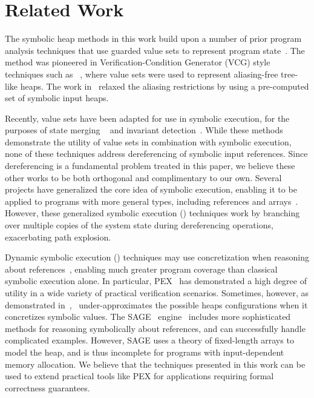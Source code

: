\section{Related Work}
\label{sec:related}
%
The symbolic heap methods in this work build upon a
number of prior program analysis techniques that use guarded value sets to
represent program
state~\cite{Sen:2014,Torlak:2014,Yorsh:2008,Xie:2005,Dillig:2011,Elkarablieh:2009}. 
The method was pioneered in Verification-Condition Generator (VCG) style techniques such as ~\cite{Xie:2005,Yorsh:2008}, where value sets were used to 
represent aliasing-free tree-like heaps. The work in~\cite{Dillig:2011} relaxed the aliasing restrictions by using a pre-computed set of symbolic input heaps.

Recently, value sets have been adapted for use in symbolic execution, for the purposes of state merging ~\cite{Sen:2014,Torlak:2014} and invariant detection~\cite{Ferrara:2014}. While these methods demonstrate the utility of value sets in combination with symbolic execution, none of these techniques address dereferencing of symbolic input references. Since dereferencing is a fundamental problem treated in this paper, we believe these other works to be both orthogonal and complimentary to our own.
%
Several projects have generalized the core idea of symbolic execution,
enabling it to be applied to programs with more general types,
including references and
arrays~\cite{GSE03,KiasanKunit,Cadar:2008,Rosner:2015}. However, these
generalized symbolic execution (\gsetxt{}) techniques work by branching over
multiple copies of the system state during dereferencing operations,
exacerbating path explosion.

Dynamic symbolic execution (\dsetxt{}) techniques may use
concretization when reasoning about references~\cite{Godefroid:2005,Sen:2005,Godefroid:POPL07,Tillmann:2008}, enabling much greater program
coverage than classical symbolic execution alone. In particular, PEX~\cite{Tillmann:2008}
has demonstrated a high degree of utility in a wide variety of 
practical verification scenarios. Sometimes,
however, as demonstrated in~\cite{Elkarablieh:2009},~\dsetxt{}
under-approximates the possible heaps configurations when it
concretizes symbolic values. The SAGE~\dsetxt{}
engine~\cite{Elkarablieh:2009} includes more sophisticated methods for
reasoning symbolically about references, and can successfully handle
complicated examples. However, SAGE uses a
theory of fixed-length arrays to model the heap, and is thus incomplete
for programs with input-dependent memory allocation. We believe that the 
techniques presented in this work can be used to extend practical tools 
like PEX for applications requiring formal correctness guarantees.

